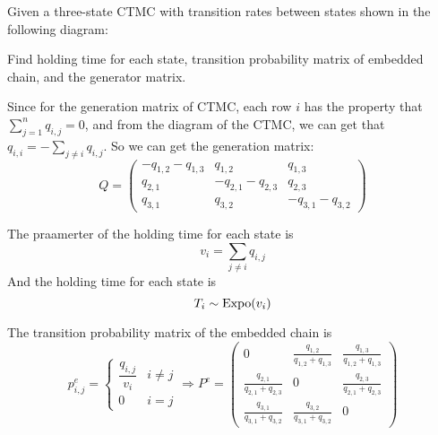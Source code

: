 \begin{homeworkProblem}

Given a three-state CTMC with transition rates between states shown in the following diagram:
\begin{center}
\end{center}
Find holding time for each state, transition probability matrix of embedded chain, and the generator matrix.

\solution

Since for the generation matrix of CTMC, each row $i$ has the property that $\sum\limits_{j=1}^{n}q_{i,j}=0$, and from the diagram of the CTMC, we can get that $q_{i,i}=-\sum\limits_{j\neq i}q_{i,j}$. So we can get the generation matrix:
$$Q = \begin{pmatrix}
-q_{1,2}-q_{1,3} & q_{1,2} & q_{1,3} \\
q_{2,1} & -q_{2,1}-q_{2,3} & q_{2,3} \\
q_{3,1} & q_{3,2} & -q_{3,1}-q_{3,2}
\end{pmatrix}$$

The praamerter of the holding time for each state is
$$v_i=\sum\limits_{j\neq i}q_{i,j}$$
And the holding time for each state is
$$T_i\sim\operatorname{Expo}(v_i)$$

The transition probability matrix of the embedded chain is
$$p_{i,j}^e=\begin{cases}
\dfrac{q_{i,j}}{v_i} & i\neq j \\
0 & i=j
\end{cases}
\Rightarrow P^e = \begin{pmatrix}
0 & \frac{q_{1,2}}{q_{1,2}+q_{1,3}} & \frac{q_{1,3}}{q_{1,2}+q_{1,3}} \\
\frac{q_{2,1}}{q_{2,1}+q_{2,3}} & 0 & \frac{q_{2,3}}{q_{2,1}+q_{2,3}} \\
\frac{q_{3,1}}{q_{3,1}+q_{3,2}} & \frac{q_{3,2}}{q_{3,1}+q_{3,2}} & 0
\end{pmatrix}$$


\end{homeworkProblem}
